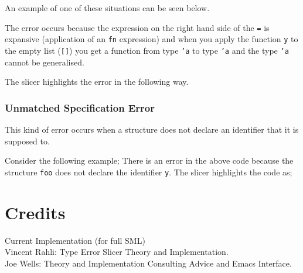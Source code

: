 \documentclass{report}
\begin{document}
\begin{itemize}
An example of one of these situations can be seen below.


The error occurs because the expression on the right hand side of the
\texttt{=} is expansive (application of an \texttt{fn} expression) and when you apply the function
\texttt{y} to the empty list (\texttt{[]}) you get a function
from type \texttt{'a} to type \texttt{'a} and the type
\texttt{'a} cannot be generalised.

The slicer highlights the error in the following way.


\newpage


\subsubsection{Unmatched Specification Error}

\subitem This kind of error occurs when a structure does not declare
an identifier that it is supposed to.

Consider the following example;
There is an error in the above code because the structure
\texttt{foo} does not declare the identifier \texttt{y}.
The slicer highlights the code as;

\end{itemize}

\section {Credits}
Current Implementation (for full SML)\\

	Vincent Rahli: Type Error Slicer Theory and Implementation.\\

	Joe Wells: Theory and Implementation Consulting Advice and Emacs
   		   Interface.\\
\end{document}
